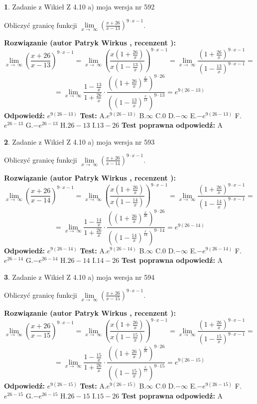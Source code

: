 \documentclass[12pt, a4paper]{article}
\theoremstyle{definition} %
\newtheorem{zad}{}
\newcommand{\zadStart}[1]{\begin{zad}#1\newline}
\newcommand{\zadStop}{\end{zad}}
\newcommand{\rozwStart}[2]{\noindent \textbf{Rozwiązanie (autor #1 , recenzent #2): }\newline}
\newcommand{\rozwStop}{\newline}
\newcommand{\odpStart}{\noindent \textbf{Odpowiedź:}\newline}
\newcommand{\odpStop}{\newline}
\newcommand{\testStart}{\noindent \textbf{Test:}\newline}
\newcommand{\testStop}{\newline}
\newcommand{\kluczStart}{\noindent \textbf{Test poprawna odpowiedź:}\newline}
\newcommand{\kluczStop}{\newline}
\begin{document}
\zadStart{Zadanie z Wikieł Z 4.10 a) moja wersja nr 592}


Obliczyć granicę funkcji  $\lim\limits_{x\to\ \infty}(\frac{x+26}{x-13})^{9\cdot x-1}$.
\zadStop
\rozwStart{Patryk Wirkus}{}
$$\lim\limits_{x\to\ \infty}(\frac{x+26}{x-13})^{9\cdot x-1} = \lim\limits_{x\to\ \infty}(\frac{x(1+\frac{26}{x})}{x(1-\frac{13}{x})})^{9\cdot x-1}=\lim\limits_{x\to\ \infty}\frac{(1+\frac{26}{x})^{9\cdot x-1}}{(1-\frac{13}{x})^{9\cdot x-1}}=$$
$$=\lim\limits_{x\to\ \infty}\frac{1-\frac{13}{x}}{1+\frac{26}{x}}\cdot\frac{((1+\frac{26}{x})^{\frac{x}{26}})^{9\cdot26}}{((1-\frac{13}{x})^{\frac{x}{13}})^{9\cdot13}}=e^{9(26-13)}$$
\rozwStop
\odpStart
$e^{9(26-13)}$
\odpStop
\testStart
A.$e^{9(26-13)}$ B.$\infty$ C.$0$ D.$-\infty$ E.$-e^{9(26-13)}$
F.$e^{26-13}$ G.$-e^{26-13}$
H.$26-13$
I.$13-26$
\testStop
\kluczStart
A
\kluczStop



\zadStart{Zadanie z Wikieł Z 4.10 a) moja wersja nr 593}


Obliczyć granicę funkcji  $\lim\limits_{x\to\ \infty}(\frac{x+26}{x-14})^{9\cdot x-1}$.
\zadStop
\rozwStart{Patryk Wirkus}{}
$$\lim\limits_{x\to\ \infty}(\frac{x+26}{x-14})^{9\cdot x-1} = \lim\limits_{x\to\ \infty}(\frac{x(1+\frac{26}{x})}{x(1-\frac{14}{x})})^{9\cdot x-1}=\lim\limits_{x\to\ \infty}\frac{(1+\frac{26}{x})^{9\cdot x-1}}{(1-\frac{14}{x})^{9\cdot x-1}}=$$
$$=\lim\limits_{x\to\ \infty}\frac{1-\frac{14}{x}}{1+\frac{26}{x}}\cdot\frac{((1+\frac{26}{x})^{\frac{x}{26}})^{9\cdot26}}{((1-\frac{14}{x})^{\frac{x}{14}})^{9\cdot14}}=e^{9(26-14)}$$
\rozwStop
\odpStart
$e^{9(26-14)}$
\odpStop
\testStart
A.$e^{9(26-14)}$ B.$\infty$ C.$0$ D.$-\infty$ E.$-e^{9(26-14)}$
F.$e^{26-14}$ G.$-e^{26-14}$
H.$26-14$
I.$14-26$
\testStop
\kluczStart
A
\kluczStop



\zadStart{Zadanie z Wikieł Z 4.10 a) moja wersja nr 594}


Obliczyć granicę funkcji  $\lim\limits_{x\to\ \infty}(\frac{x+26}{x-15})^{9\cdot x-1}$.
\zadStop
\rozwStart{Patryk Wirkus}{}
$$\lim\limits_{x\to\ \infty}(\frac{x+26}{x-15})^{9\cdot x-1} = \lim\limits_{x\to\ \infty}(\frac{x(1+\frac{26}{x})}{x(1-\frac{15}{x})})^{9\cdot x-1}=\lim\limits_{x\to\ \infty}\frac{(1+\frac{26}{x})^{9\cdot x-1}}{(1-\frac{15}{x})^{9\cdot x-1}}=$$
$$=\lim\limits_{x\to\ \infty}\frac{1-\frac{15}{x}}{1+\frac{26}{x}}\cdot\frac{((1+\frac{26}{x})^{\frac{x}{26}})^{9\cdot26}}{((1-\frac{15}{x})^{\frac{x}{15}})^{9\cdot15}}=e^{9(26-15)}$$
\rozwStop
\odpStart
$e^{9(26-15)}$
\odpStop
\testStart
A.$e^{9(26-15)}$ B.$\infty$ C.$0$ D.$-\infty$ E.$-e^{9(26-15)}$
F.$e^{26-15}$ G.$-e^{26-15}$
H.$26-15$
I.$15-26$
\testStop
\kluczStart
A
\kluczStop
\end{document}

